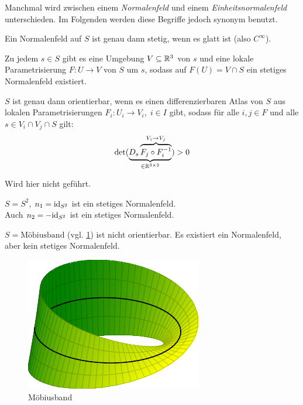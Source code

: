 Manchmal wird zwischen einem \textit{Normalenfeld} und einem
\textit{Einheitsnormalenfeld} unterschieden.
Im Folgenden werden diese Begriffe jedoch synonym benutzt.

\begin{bemerkung}%
    \begin{bemenum}
        \item Ein Normalenfeld auf $S$ ist genau dann stetig, wenn es
              glatt ist (also $C^\infty$).
        \item Zu jedem $s \in S$ gibt es eine Umgebung $V \subseteq \mathbb{R}^3$
              von $s$ und eine lokale Parametrisierung $F: U \rightarrow V$
              von $S$ um $s$, sodass auf $F(U) = V \cap S$
              ein stetiges Normalenfeld existiert.
        \item $S$ ist genau dann orientierbar, wenn es einen 
              differenzierbaren Atlas von $S$ aus lokalen Parametrisierungen
              $F_i: U_i \rightarrow V_i,\;i \in I$ gibt, sodass
              für alle $i, j \in F$ und alle $s \in V_i \cap V_j \cap S$
              gilt:
              \[\det(\underbrace{D_s \overbrace{F_j \circ F_i^{-1}}^{V_i \rightarrow V_j}}_{\in \mathbb{R}^{3 \times 3}}) > 0\]
    \end{bemenum}
\end{bemerkung}

\begin{beweis}
    Wird hier nicht geführt.%
\end{beweis}

\begin{beispiel}[Normalenfelder]
    \begin{bspenum}
        \item $S = S^2$, $n_1 = \textnormal{id}_{S^2}$ ist ein stetiges Normalenfeld.\\
              Auch $n_2 = - \textnormal{id}_{S^2}$ ist ein stetiges Normalenfeld.
        \item $S = \text{Möbiusband}$ (vgl. \cref{fig:moebius-strip})
              ist nicht orientierbar. Es existiert ein Normalenfeld,
              aber kein stetiges Normalenfeld.
    \end{bspenum}
\end{beispiel}

\begin{figure}[htp]
    \centering
    \includegraphics[width=0.5\linewidth, keepaspectratio]{figures/moebius-strip.pdf} 
    \caption{Möbiusband}
    \label{fig:moebius-strip}
\end{figure}

